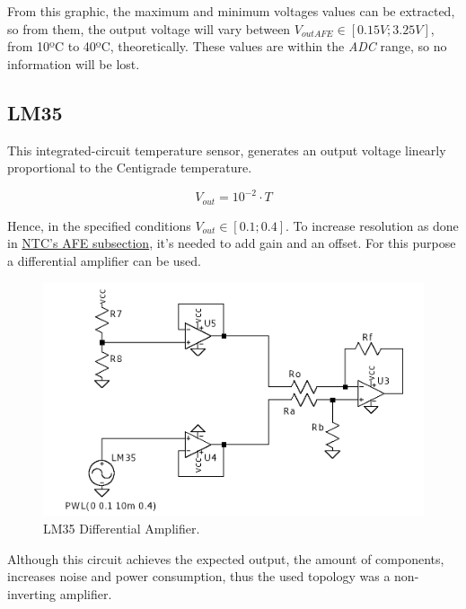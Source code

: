 \documentclass[12pt]{article}
\begin{document}
    From this graphic, the maximum and minimum voltages values can be extracted, so from them, the output voltage 
    will vary between $V_{outAFE} \in [0.15V;3.25V]$, from 10ºC to 40ºC, theoretically. These values are within the \textit{ADC} range, so no information will be lost.
\subsection{LM35}

    This integrated-circuit temperature sensor, generates an output
    voltage linearly proportional to the Centigrade temperature.

    $$V_{out} = 10^{-2}\cdot T$$

    Hence, in the specified conditions $V_{out}\in[0.1;0.4]$. 
    To increase resolution as done in \hyperref[AFENTCCirc]{NTC's AFE subsection},
    it's needed to add gain and an offset. 
    For this purpose a differential amplifier can be used.  
    
    \begin{figure}[H] 
        \centering
        \includegraphics*[scale = 0.3]{images/DiffAmpLM35.png}
        \caption{LM35 Differential Amplifier.}
        \label{wrap-fig:1}
    \end{figure}

    Although this circuit achieves the expected output, the amount of components,
    increases noise and power consumption, thus the used topology was a non-inverting amplifier.
\end{document}
